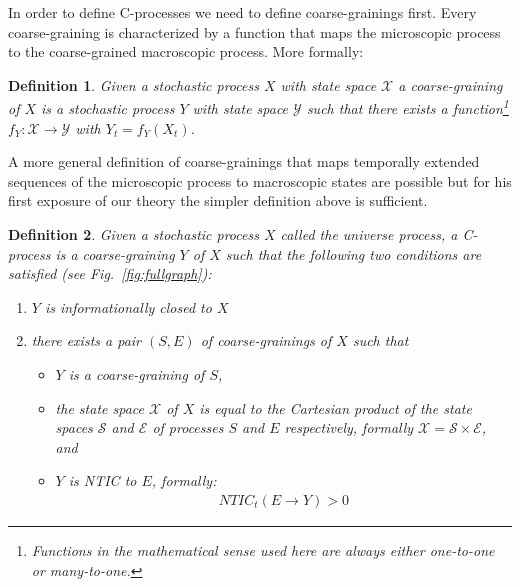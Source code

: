 \documentclass[utf8]{article}
\newtheorem{definition}{Definition}
\begin{document}
	   	In order to define C-processes we need to define coarse-grainings first. Every coarse-graining is characterized by a function that maps the microscopic process to the coarse-grained macroscopic process. More formally: 
	   	
	   	\begin{definition}
	   	Given a stochastic process $X$ with state space $\mathcal{X}$ a \emph{coarse-graining of $X$} is a stochastic process $Y$ with state space $\mathcal{Y}$ such that there exists a function\footnote{Functions in the mathematical sense used here are always either one-to-one or many-to-one.} $f_Y:\mathcal{X}\rightarrow \mathcal{Y}$ with $Y_t=f_Y(X_t)$.  
	   	\end{definition}
	   	A more general definition of coarse-grainings that maps temporally extended sequences of the microscopic process to macroscopic states are possible but for his first exposure of our theory the simpler definition above is sufficient. 
	   	
        \begin{definition}
        Given a stochastic process $X$ called the universe process, a \emph{C-process} is a coarse-graining $Y$ of $X$ such that the following two conditions are satisfied (see Fig.~\ref{fig:fullgraph}):
        \begin{enumerate}
        \item $Y$ is informationally closed to $X$
        \item there exists a pair $(S,E)$ of coarse-grainings of $X$ such that 
        \begin{itemize}
            \item $Y$ is a coarse-graining of $S$,
            \item the state space $\mathcal{X}$ of $X$ is equal to the Cartesian product of the state spaces $\mathcal{S}$ and $\mathcal{E}$ of processes $S$ and $E$ respectively, formally $\mathcal{X}=\mathcal{S}\times\mathcal{E}$, and 
            \item $Y$ is NTIC to $E$, formally:
        \begin{align}
            NTIC_t(E\rightarrow Y) >0
        \end{align}
        \end{itemize} 
        \end{enumerate}
       \end{definition}
        
\end{document}
